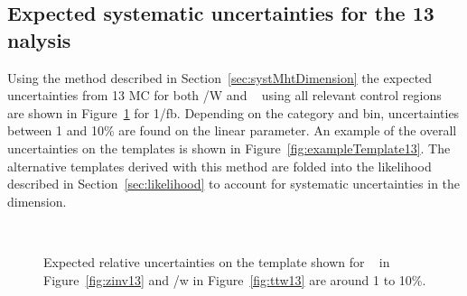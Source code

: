 \subsection{Expected systematic uncertainties for the 13 \texorpdfstring{\TeV} analysis}
\label{sec:syst13TeV}
Using the method described in Section~\ref{sec:systMhtDimension} the expected uncertainties
from 13 \TeV MC for both \ttbar/W  and \zInv~ using all relevant control regions are
shown in Figure~\ref{fig:expected13} for 1/fb. 
Depending on the category and \scalht bin, uncertainties between 1 and 10\% are found
on the linear parameter.
An example of the overall uncertainties on the \mht templates is shown
in Figure~\ref{fig:exampleTemplate13}.
The alternative templates derived with this method are folded into the 
likelihood described in Section~\ref{sec:likelihood} to account for
systematic uncertainties in the \mht dimension.

\begin{figure}[h!]
  \centering
  ~~
  \\
  \caption{\label{fig:expected13} Expected relative uncertainties on the template shown for \zInv~ in Figure~\ref{fig:zinv13} 
  and \ttbar/w in Figure~\ref{fig:ttw13} are around 1 to 10\%.}
  
\end{figure}

